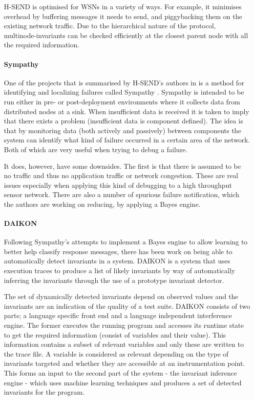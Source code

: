 H-SEND is optimised for WSNs in a variety of ways. For example, it minimises overhead by buffering messages it needs to send, and piggybacking them on the existing network traffic. Due to the hierarchical nature of the protocol, multinode-invariants can be checked efficiently at the closest parent node with all the required information.

\paragraph{Sympathy} One of the projects that is summarised by H-SEND's authors \citeauthor{herbert2007adaptive} in \cite{herbert2007adaptive} is a method for identifying and localizing failures called Sympathy \cite{ramanathan2005sympathy}. Sympathy is intended to be run either in pre- or post-deployment environments where it collects data from distributed nodes at a sink. When insufficient data is received it is taken to imply that there exists a problem (insufficient data is component defined). The idea is that by monitoring data (both actively and passively) between components the system can identify what kind of failure occurred in a certain area of the network. Both of which are very useful when trying to debug a failure.

It does, however, have some downsides. The first is that there is assumed to be no traffic and thus no application traffic or network congestion. These are real issues especially when applying this kind of debugging to a high throughput sensor network. There are also a number of spurious failure notification, which the authors are working on reducing, by applying a Bayes engine.

\paragraph{DAIKON} Following Sympathy's attempts to implement a Bayes engine to allow learning to better help classify response messages, there has been work on being able to automatically detect invariants in a system. DAIKON \cite{DAIKON} is a system that uses execution traces to produce a list of likely invariants by way of automatically inferring the invariants through the use of a prototype invariant detector.

The set of dynamically detected invariants depend on observed values and the invariants are an indication of the quality of a test suite. DAIKON consists of two parts; a language specific front end and a language independent interference engine. The former executes the running program and accesses its runtime state to get the required information (consist of variables and their value). This information contains a subset of relevant variables and only these are written to the trace file. A variable is considered as relevant depending on the type of invariants targeted and whether they are accessible at an instrumentation point. This forms an input to the second part of the system - the invariant inference engine - which uses machine learning techniques and produces a set of detected invariants for the program.

